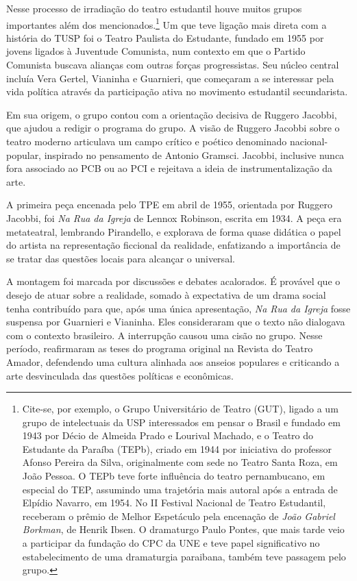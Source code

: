 Nesse processo de irradiação do teatro estudantil houve muitos grupos
importantes além dos mencionados.\footnote{Cite-se, por exemplo, o Grupo
  Universitário de Teatro (GUT), ligado a um grupo de intelectuais da
  USP interessados em pensar o Brasil e fundado em 1943 por Décio de
  Almeida Prado e Lourival Machado, e o Teatro do Estudante da Paraíba
  (TEPb), criado em 1944 por iniciativa do professor Afonso Pereira da
  Silva, originalmente com sede no Teatro Santa Roza, em João Pessoa. O
  TEPb teve forte influência do teatro pernambucano, em especial do TEP,
  assumindo uma trajetória mais autoral após a entrada de Elpídio
  Navarro, em 1954. No II Festival Nacional de Teatro Estudantil,
  receberam o prêmio de Melhor Espetáculo pela encenação de \textit{João
  Gabriel Borkman}, de Henrik Ibsen. O dramaturgo Paulo Pontes, que mais
  tarde veio a participar da fundação do CPC da UNE e teve papel
  significativo no estabelecimento de uma dramaturgia paraibana, também
  teve passagem pelo grupo.} Um que teve ligação mais direta com a
história do TUSP foi o Teatro Paulista do Estudante, fundado em 1955 por
jovens ligados à Juventude Comunista, num contexto em que o Partido
Comunista buscava alianças com outras forças progressistas. Seu núcleo
central incluía Vera Gertel, Vianinha e Guarnieri, que começaram a se
interessar pela vida política através da participação ativa no movimento
estudantil secundarista.

Em sua origem, o grupo contou com a orientação decisiva de Ruggero
Jacobbi, que ajudou a redigir o programa do grupo. A visão de Ruggero
Jacobbi sobre o teatro moderno articulava um campo crítico e poético
denominado nacional-popular, inspirado no pensamento de Antonio Gramsci.
Jacobbi, inclusive nunca fora associado ao PCB ou ao PCI e rejeitava a
ideia de instrumentalização da arte.

A primeira peça encenada pelo TPE em abril de 1955, orientada por
Ruggero Jacobbi, foi \textit{Na Rua da Igreja} de Lennox Robinson, escrita
em 1934. A peça era metateatral, lembrando Pirandello, e explorava de
forma quase didática o papel do artista na representação ficcional da
realidade, enfatizando a importância de se tratar das questões locais
para alcançar o universal.

A montagem foi marcada por discussões e debates acalorados. É provável
que o desejo de atuar sobre a realidade, somado à expectativa de um
drama social tenha contribuído para que, após uma única apresentação,
\textit{Na Rua da Igreja} fosse suspensa por Guarnieri e Vianinha. Eles
consideraram que o texto não dialogava com o contexto brasileiro. A
interrupção causou uma cisão no grupo. Nesse período, reafirmaram as
teses do programa original na Revista do Teatro Amador, defendendo uma
cultura alinhada aos anseios populares e criticando a arte desvinculada
das questões políticas e econômicas.

